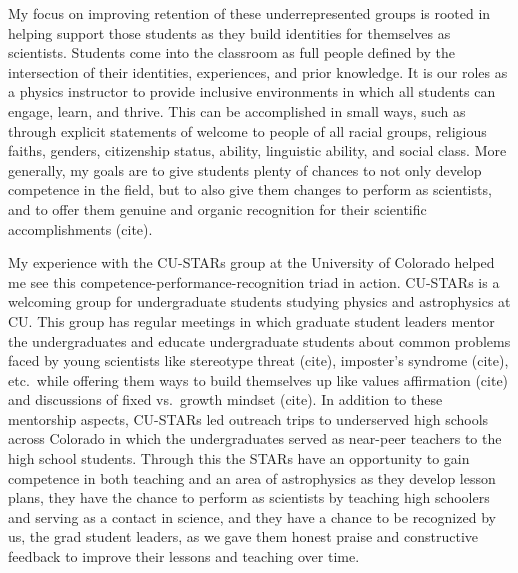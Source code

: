 \documentclass[11pt]{article}
\begin{document}
My focus on improving retention of these underrepresented groups is rooted in helping support those students as they build identities for themselves as scientists. 
Students come into the classroom as full people defined by the intersection of their identities, experiences, and prior knowledge. 
It is our roles as a physics instructor to provide inclusive environments in which all students can engage, learn, and thrive. 
This can be accomplished in small ways, such as through explicit statements of welcome to people of all racial groups, religious faiths, genders, citizenship status, ability, linguistic ability, and social class. 
More generally, my goals are to give students plenty of chances to not only develop competence in the field, but to also give them changes to perform as scientists, and to offer them genuine and organic recognition for their scientific accomplishments (cite).

My experience with the CU-STARs group at the University of Colorado helped me see this competence-performance-recognition triad in action. 
CU-STARs is a welcoming group for undergraduate students studying physics and astrophysics at CU. 
This group has regular meetings in which graduate student leaders mentor the undergraduates and educate undergraduate students about common problems faced by young scientists like stereotype threat (cite), imposter’s syndrome (cite), etc.~while offering them ways to build themselves up like values affirmation (cite) and discussions of fixed vs.~growth mindset (cite). 
In addition to these mentorship aspects, CU-STARs led outreach trips to underserved high schools across Colorado in which the undergraduates served as near-peer teachers to the high school students. 
Through this the STARs have an opportunity to gain competence in both teaching and an area of astrophysics as they develop lesson plans, they have the chance to perform as scientists by teaching high schoolers and serving as a contact in science, and they have a chance to be recognized by us, the grad student leaders, as we gave them honest praise and constructive feedback to improve their lessons and teaching over time.
\end{document}
